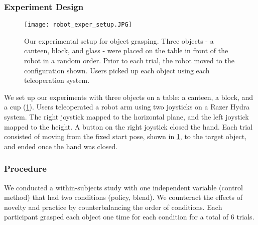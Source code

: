 



\subsubsection{Experiment Design}
\label{sec:experiment_rss_2015_design}

\begin{figure}[t]
\centering
\texttt{[image: robot\_exper\_setup.JPG]}
\caption{Our experimental setup for object grasping. Three objects - a canteen, block, and glass - were placed on the table in front of the robot in a random order. Prior to each trial, the robot moved to the configuration shown. Users picked up each object using each teleoperation system.}%
 \label{fig:exper_setup_rss_2015}
\end{figure} 


We set up our experiments with three objects on a table: a canteen, a block, and a cup (\cref{fig:exper_setup_rss_2015}). Users teleoperated a robot arm using two joysticks on a Razer Hydra system. The right joystick mapped to the horizontal plane, and the left joystick mapped to the height. A button on the right joystick closed the hand. Each trial consisted of moving from the fixed start pose, shown in \cref{fig:exper_setup_rss_2015}, to the target object, and ended once the hand was closed.



\subsubsection{Procedure}

We conducted a within-subjects study with one independent variable (control method) that had two conditions (policy, blend). We counteract the effects of novelty and practice by counterbalancing the order of conditions. Each participant grasped each object one time for each condition for a total of 6 trials.

